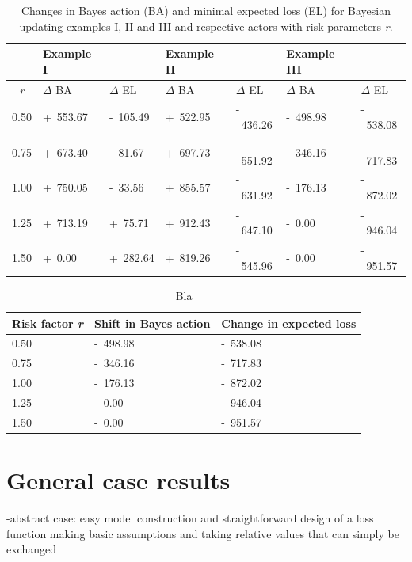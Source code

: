 	\begin{table}
		\centering
		\begin{tabular}[c]{| c || l | l || l | l || l | l |}
			\hline
			& Example I & & Example II & & Example III & \\
			\hline
			\hline
			\textit{r} & $\Delta$ BA & $\Delta$ EL & $\Delta$ BA & $\Delta$ EL & $\Delta$ BA & $\Delta$ EL\\ 
			\hline
			0.50 & +~553.67 & -~105.49 & +~522.95 & -~436.26 & -~498.98 & -~538.08 \\ 
			0.75 & +~673.40 & -~81.67 & +~697.73 & -~551.92 & -~346.16 & -~717.83  \\ 
			1.00 & +~750.05 & -~33.56 & +~855.57 & -~631.92 & -~176.13 & -~872.02 \\ 
			1.25 & +~713.19 & +~75.71 & +~912.43 & -~647.10 & -~0.00 & -~946.04 \\ 
			1.50 & +~0.00 & +~282.64 & +~819.26 & -~545.96 & -~0.00 & -~951.57  \\ 
			\hline
		\end{tabular}
		\caption{Changes in Bayes action (BA) and minimal expected loss (EL) for Bayesian updating examples I, II and III and respective actors with risk parameters \textit{r}.}
		\label{tab:update_examples_all}
	\end{table}
	
	\begin{table}
			\centering
			\begin{tabular}[c]{| l | l | l |}
				\hline
				Risk factor \textit{r} & Shift in Bayes action & Change in expected loss \\ \hline
				0.50 & -~498.98 & -~538.08 \\ 
				0.75 & -~346.16 & -~717.83  \\ 
				1.00 & -~176.13 & -~872.02 \\ 
				1.25 & -~0.00 & -~946.04 \\ 
				1.50 & -~0.00 & -~951.57  \\ 
				\hline
			\end{tabular}
			\caption{Bla}
			\label{tab:update_examples_all}
	\end{table}
		
	\section{General case results}
	
	-abstract case: easy model construction and straightforward design of a loss function making basic assumptions and taking relative values that can simply be exchanged
	
